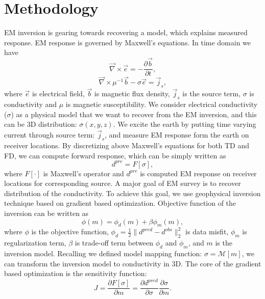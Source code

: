 \documentclass{segabs}
\newcommand{\curl}{{\vec \nabla}\times}
\newcommand {\J}{{\vec J}}
\newcommand {\E}{{\vec E}}
\newcommand{\B}{\vec{B}}
\renewcommand {\j}  { {\vec j} }
\renewcommand {\b}  { {\vec b} }
\newcommand {\e}  { {\vec e} }
\newcommand{\dbdt}{\frac{\partial \b}{\partial t}}
\begin{document}
\section*{Methodology}
EM inversion is gearing towards recovering a model, which explains measured response. EM response is governed by Maxwell's equations.  In time domain we have
\begin{equation}
  \curl \e = -\dbdt,
\end{equation}
\begin{equation}
  \curl \mu^{-1}\b -\sigma \e = \j_s,
\end{equation}
where $\e$ is electrical field, $\b$ is magnetic flux density, $\j_s$ is the source term, $\sigma$ is conductivity and $\mu$ is magnetic susceptibility.
We consider electrical conductivity ($\sigma$) as a physical model that we want to recover from the EM inversion, and this can be 3D distribution: $\sigma(x, y, z)$. We excite the earth by putting time varying current through source term: $\j_s$, and measure EM response form the earth on receiver locations. By discretizing above Maxwell's equations for both TD and FD, we can compute forward response, which can be simply written as
\begin{equation}
  d^{pre} = F[\sigma],
\end{equation}
where $F[\cdot]$ is Maxwell's operator and $d^{pre}$ is computed EM response on receiver locations for corresponding source.
A major goal of EM survey is to recover distribution of the conductivity. To achieve this goal, we use geophysical inversion technique based on gradient based optimization. Objective function of the inversion can be written as
\begin{equation}
  \phi(m) = \phi_d(m) + \beta\phi_m(m),
\end{equation}
where $\phi$ is the objective function, $\phi_d=\frac{1}{2}\|d^{pred}-d^{obs}\|^2_2$ is data misfit, $\phi_m$ is regularization term, $\beta$ is trade-off term between $\phi_d$ and $\phi_m$, and $m$ is the inversion model. Recalling we defined model mapping function: $\sigma = \mathcal{M}[m]$, we can transform the inversion model to conductivity in 3D. The core of the gradient based optimization is the sensitivity function:
\begin{equation}
  J = \frac{\partial F[\sigma]}{\partial m} = \frac{\partial d^{pred}}{\partial \sigma}\frac{\partial \sigma}{\partial m}.
\end{equation}
\end{document}
